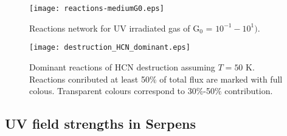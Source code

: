 \documentclass{aa}
\begin{document}
\begin{figure} 
\texttt{[image: reactions-mediumG0.eps]} 
\caption{Reactions network for UV irradiated gas of G$_0$ = $10^{-1} - 10^{1})$.}
\label{reactions_mediumG0} 
\end{figure}
\begin{figure} 
\texttt{[image: destruction\_HCN\_dominant.eps]} 
\caption{Dominant reactions
of HCN destruction assuming $T = 50$ K. Reactions conributed at least 50$\%$ of total flux are marked with full colous.
Transparent colours correspond to 30$\%$-50$\%$ contribution.} 
\label{HCN_dest} 
\end{figure}
\subsection{UV field strengths in Serpens}
\end{document}
